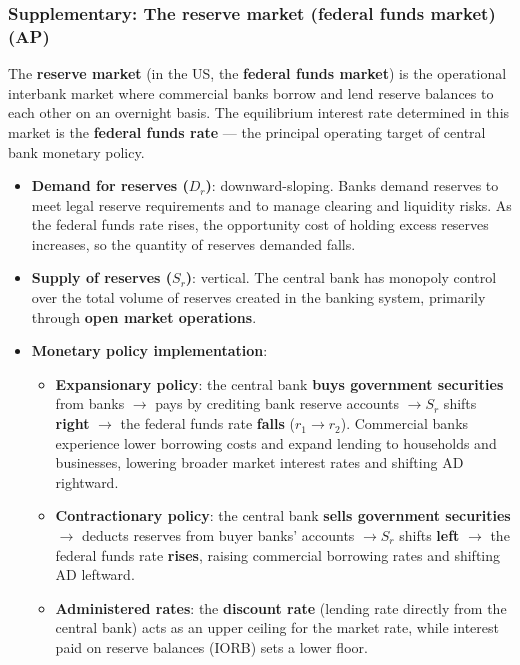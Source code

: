 \documentclass[a4paper,12pt]{article}
\newcommand{\needbold}[1]{\textcolor{red!70!black}{\textbf{#1}}}
\begin{document}
\subsubsection*{Supplementary: The reserve market (federal funds market) (AP)}
The \needbold{reserve market} (in the US, the \needbold{federal funds market}) is the operational interbank market where commercial banks borrow and lend reserve balances to each other on an overnight basis. The equilibrium interest rate determined in this market is the \needbold{federal funds rate} --- the principal operating target of central bank monetary policy.
\begin{itemize}
  \item \textbf{Demand for reserves ($D_r$)}: downward-sloping. Banks demand reserves to meet legal reserve requirements and to manage clearing and liquidity risks. As the federal funds rate rises, the opportunity cost of holding excess reserves increases, so the quantity of reserves demanded falls.
  \item \textbf{Supply of reserves ($S_r$)}: vertical. The central bank has monopoly control over the total volume of reserves created in the banking system, primarily through \textbf{open market operations}.
  \item \textbf{Monetary policy implementation}:
  \begin{itemize}
    \item \textbf{Expansionary policy}: the central bank \textbf{buys government securities} from banks $\to$ pays by crediting bank reserve accounts $\to S_r$ shifts \textbf{right} $\to$ the federal funds rate \textbf{falls} ($r_1 \to r_2$). Commercial banks experience lower borrowing costs and expand lending to households and businesses, lowering broader market interest rates and shifting AD rightward.
    \item \textbf{Contractionary policy}: the central bank \textbf{sells government securities} $\to$ deducts reserves from buyer banks' accounts $\to S_r$ shifts \textbf{left} $\to$ the federal funds rate \textbf{rises}, raising commercial borrowing rates and shifting AD leftward.
    \item \textbf{Administered rates}: the \textbf{discount rate} (lending rate directly from the central bank) acts as an upper ceiling for the market rate, while interest paid on reserve balances (IORB) sets a lower floor.
  \end{itemize}
\end{itemize}
\end{document}
